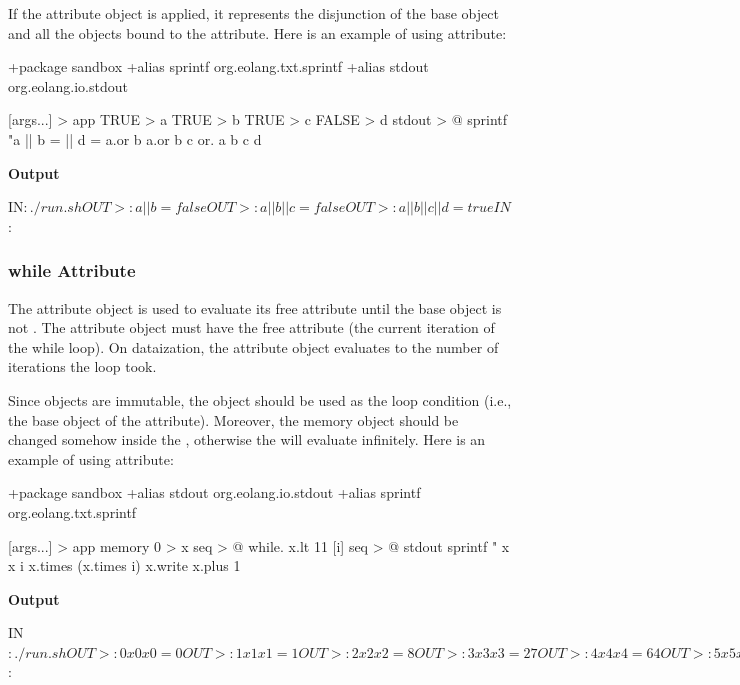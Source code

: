 \documentclass[12pt]{book}
\begin{document}
{If the  attribute object is applied, it represents the disjunction of the base  object and all the objects bound to the  attribute. Here is an example of using  attribute:

\begin{ffcode}
+package sandbox
+alias sprintf org.eolang.txt.sprintf
+alias stdout org.eolang.io.stdout

[args...] > app
  TRUE > a
  TRUE > b
  TRUE > c
  FALSE > d
  stdout > @
    sprintf
      "a || b = %
      || d = %
      a.or b
      a.or b c
      or.
        a
        b
        c
        d
\end{ffcode}
\textbf{Output}
\begin{ffcode}
IN$: ./run.sh
OUT>: a || b = false
OUT>: a || b || c = false
OUT>: a || b || c || d = true
IN$: 
\end{ffcode}

\subsubsection{while Attribute}
The  attribute object is used to evaluate its  free attribute until the base  object is not .
The  attribute object must have the free attribute  (the current iteration of the while loop).
On dataization, the  attribute object evaluates to the number of iterations the loop took.

Since objects are immutable, the  object should be used as the loop condition (i.e., the base  object of the  attribute). Moreover, the memory object should be changed somehow inside the , otherwise the  will evaluate infinitely. Here is an example of using  attribute:

\begin{ffcode}
+package sandbox
+alias stdout org.eolang.io.stdout
+alias sprintf org.eolang.txt.sprintf

[args...] > app
  memory 0 > x
  seq > @
    while.
      x.lt 11
      [i]
        seq > @
          stdout
            sprintf "%
              x
              x
              i
              x.times (x.times i)
          x.write
            x.plus 1
\end{ffcode}
\textbf{Output} 
\begin{ffcode}
IN$: ./run.sh
OUT>: 0 x 0 x 0 = 0
OUT>: 1 x 1 x 1 = 1
OUT>: 2 x 2 x 2 = 8
OUT>: 3 x 3 x 3 = 27
OUT>: 4 x 4 x 4 = 64
OUT>: 5 x 5 x 5 = 125
OUT>: 6 x 6 x 6 = 216
OUT>: 7 x 7 x 7 = 343
OUT>: 8 x 8 x 8 = 512
OUT>: 9 x 9 x 9 = 729
OUT>: 10 x 10 x 10 = 1000
IN$: 
\end{ffcode}

}
\end{document}

